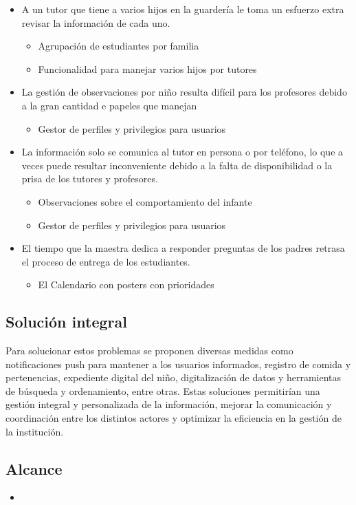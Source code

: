 \documentclass{article}
\begin{document}
\begin{itemize}
	      \begin{itemize}
		      \item A un tutor que tiene a varios hijos en la guardería le toma un esfuerzo extra revisar la información de cada uno.
		            \begin{itemize}
			            \item Agrupación de estudiantes por familia
			            \item Funcionalidad para manejar varios hijos por tutores
		            \end{itemize}
		      \item La gestión de observaciones por niño resulta difícil para los profesores debido a la gran cantidad e papeles que manejan
		            \begin{itemize}
			            \item Gestor de perfiles y privilegios para usuarios
		            \end{itemize}
		      \item La información solo se comunica al tutor en persona o por teléfono, lo que a veces puede resultar inconveniente debido a la falta de disponibilidad o la prisa de los tutores y profesores.
		            \begin{itemize}
			            \item Observaciones sobre el comportamiento del infante
			            \item Gestor de perfiles y privilegios para usuarios
		            \end{itemize}
		      \item El tiempo que la maestra dedica a responder preguntas de los padres retrasa el proceso de entrega de los estudiantes.
		            \begin{itemize}
			            \item El Calendario con posters con prioridades
		            \end{itemize}
	      \end{itemize}
\end{itemize}

\subsection*{Solución integral}
Para solucionar estos problemas se proponen diversas medidas como notificaciones push para mantener a los usuarios informados, registro de comida y pertenencias, expediente digital del niño, digitalización de datos y herramientas de búsqueda y ordenamiento, entre otras. Estas soluciones permitirían una gestión integral y personalizada de la información, mejorar la comunicación y coordinación entre los distintos actores y optimizar la eficiencia en la gestión de la institución.


\subsection*{Alcance}
\begin{itemize}
	\item 
\end{itemize}
\end{document}

